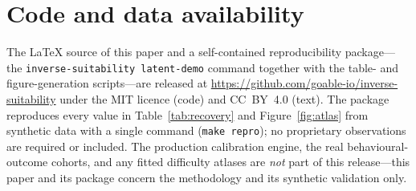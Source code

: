 \section*{Code and data availability}

\sloppy
The \LaTeX{} source of this paper and a self-contained reproducibility package---
the \texttt{inverse-\allowbreak suitability latent-demo} command together with the table- and
figure-generation scripts---are released at
\url{https://github.com/goable-io/inverse-suitability} under the MIT licence
(code) and CC~BY~4.0 (text). The package reproduces every value in
Table~\ref{tab:recovery} and Figure~\ref{fig:atlas} from synthetic data with a
single command (\texttt{make repro}); no proprietary observations are required or
included. The production calibration engine, the real behavioural-outcome cohorts,
and any fitted difficulty atlases are \emph{not} part of this release---this paper
and its package concern the methodology and its synthetic validation only.
